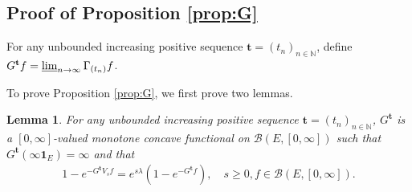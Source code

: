 \documentclass[12pt,a4paper]{amsart}
\numberwithin{equation}{section}
\theoremstyle{plain}
\newtheorem{lem}[thm]{Lemma}
\theoremstyle{definition}
\theoremstyle{remark}
\begin{document}
\subsection{Proof of Proposition \ref{prop:G}}\label{sec:G}
	For any unbounded increasing positive sequence $\mathbf t = (t_n)_{n\in \mathbb N}$, define $G^\mathbf t f = \varliminf_{n\to \infty} \Gamma_{(t_n)} f$.

	To prove Proposition \ref{prop:G}, we first prove two lemmas.

\begin{lem} \label{prop:Gtb:H1:H2:H3:H4}
	For any unbounded increasing positive sequence $\mathbf t = (t_n)_{n\in \mathbb N}$,
	$G^\mathbf t$ is a $[0,\infty]$-valued monotone concave functional on $\mathcal B(E,[0,\infty])$
	such that $G^{\mathbf t}(\infty \mathbf 1_E) = \infty$ and that
	\begin{align}
	1 - e^{-G^\mathbf t V_s f}
	= e^{s\lambda} (1-e^{- G^\mathbf t f}),
	\quad s\geq 0, f\in \mathcal B(E,[0,\infty]).
	\end{align}
\end{lem}
\end{document}
